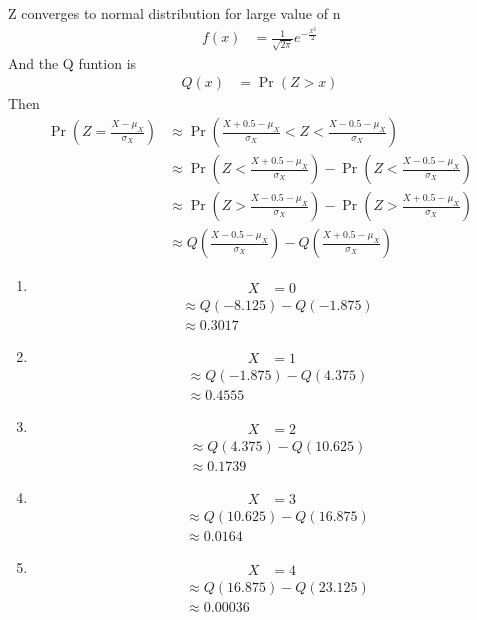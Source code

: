 \documentclass[journal,11pt,onecolumn]{IEEEtran}
\providecommand{\pr}[1]{\ensuremath{\Pr\left(#1\right)}}
\providecommand{\qfunc}[1]{\ensuremath{Q\left(#1\right)}}
\providecommand{\brak}[1]{\ensuremath{\left(#1\right)}}
\providecommand{\pr}[1]{\ensuremath{\Pr\left(#1\right)}}
\providecommand{\qfunc}[1]{\ensuremath{Q\left(#1\right)}}
\providecommand{\qfunc}[1]{\ensuremath{Q\left(#1\right)}}
\begin{document}
Z converges to normal distribution for large value of n
\begin{align}
	f\brak{x}&=\frac{1}{\sqrt{2\pi}}e^{-\frac{x^2}{2}}
\end{align}
And the Q funtion is 
\begin{align}
	\qfunc{x}&=\pr{Z >x}
\end{align}
Then 
\begin{align}
\pr{Z=\frac{X-\mu_X}{\sigma_X}} &\approx \pr{\frac{X+0.5-\mu_X}{\sigma_X} < Z < \frac{X-0.5-\mu_X}{\sigma_X}}\\
	&\approx \pr{Z<\frac{X+0.5-\mu_X}{\sigma_X}} - \pr{Z<\frac{X-0.5-\mu_X}{\sigma_X}}\\
	&\approx \pr{Z>\frac{X-0.5-\mu_X}{\sigma_X}} - \pr{Z>\frac{X+0.5-\mu_X}{\sigma_X}}\\
	&\approx \qfunc{\frac{X-0.5-\mu_X}{\sigma_X}} - \qfunc{\frac{X+0.5-\mu_X}{\sigma_X}}
\end{align}
\begin{enumerate}
	\item 
	\begin{align}
		X&=0
	\end{align}
	\begin{align}
	&\approx \qfunc{-8.125} - \qfunc{-1.875}\\
	&\approx 0.3017
	\end{align}
	\item 
	\begin{align}
		X&=1
	\end{align}
	\begin{align}
	&\approx \qfunc{-1.875} - \qfunc{4.375}\\
	&\approx 0.4555
	\end{align}
	\item 
	\begin{align}
		X&=2
	\end{align}
	\begin{align}
	&\approx \qfunc{4.375} - \qfunc{10.625}\\
	&\approx 0.1739
	\end{align}
	\item 
	\begin{align}
		X&=3
	\end{align}
	\begin{align}
	&\approx \qfunc{10.625} - \qfunc{16.875}\\
	&\approx 0.0164
	\end{align}
	\item 
	\begin{align}
		X&=4
	\end{align}
	\begin{align}
	&\approx \qfunc{16.875} - \qfunc{23.125}\\
	&\approx 0.00036
	\end{align}
\end{enumerate}
\end{document}
